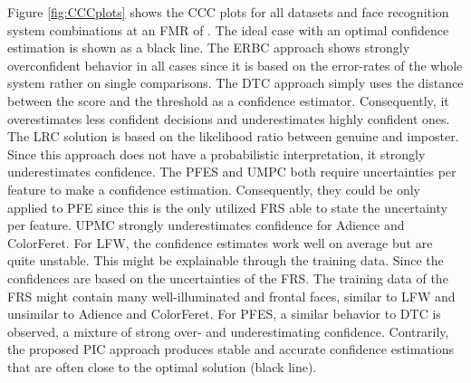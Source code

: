 \documentclass[10pt,twocolumn,letterpaper]{article}
\begin{document}
Figure \ref{fig:CCCplots} shows the CCC plots for all datasets and face recognition system combinations at an FMR of .
The ideal case with an optimal confidence estimation is shown as a black line.
The ERBC approach shows strongly overconfident behavior in all cases since it is based on the error-rates of the whole system rather on single comparisons.
The DTC approach simply uses the distance between the score and the threshold as a confidence estimator.
Consequently, it overestimates less confident decisions and underestimates highly confident ones.
The LRC solution is based on the likelihood ratio between genuine and imposter.
Since this approach does not have a probabilistic interpretation, it strongly underestimates confidence.
The PFES and UMPC both require uncertainties per feature to make a confidence estimation.
Consequently, they could be only applied to PFE since this is the only utilized FRS able to state the uncertainty per feature.
UPMC strongly underestimates confidence for Adience and ColorFeret.
For LFW, the confidence estimates work well on average but are quite unstable.
This might be explainable through the training data.
Since the confidences are based on the uncertainties of the FRS.
The training data of the FRS might contain many well-illuminated and frontal faces, similar to LFW and unsimilar to Adience and ColorFeret.
For PFES, a similar behavior to DTC is observed, a mixture of strong over- and underestimating confidence.
Contrarily, the proposed PIC approach produces stable and accurate confidence estimations that are often close to the optimal solution (black line).
\end{document}
